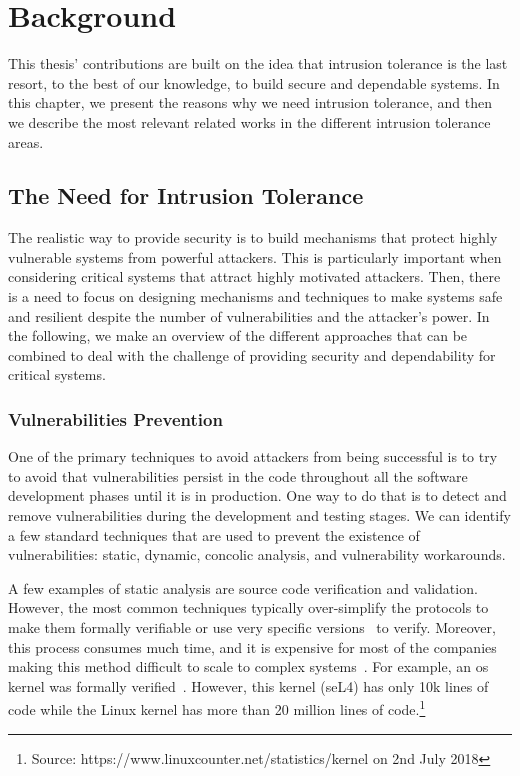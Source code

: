 \chapter{Background}
\label{chap:related_work}

This thesis' contributions are built on the idea that intrusion tolerance is the last resort, to the best of our knowledge, to build secure and dependable systems.
In this chapter, we present the reasons why we need intrusion tolerance, and then we describe the most relevant related works in the different intrusion tolerance areas.


\section{The Need for Intrusion Tolerance}
The realistic way to provide security is to build mechanisms that protect highly vulnerable systems from powerful attackers.
This is particularly important when considering critical systems that attract highly motivated attackers. 
Then, there is a need to focus on designing mechanisms and techniques to make systems safe and resilient despite the number of vulnerabilities and the attacker's power.
In the following, we make an overview of the different approaches that can be combined to deal with the challenge of providing security and dependability for critical systems.

\subsection{Vulnerabilities Prevention}
One of the primary techniques to avoid attackers from being successful is to try to avoid that vulnerabilities persist in the code throughout all the software development phases until it is in production. 
One way to do that is to detect and remove vulnerabilities during the development and testing stages.
We can identify a few standard techniques that are used to prevent the existence of vulnerabilities: static, dynamic, concolic analysis, and vulnerability workarounds.

A few examples of static analysis are source code verification and validation. 
However, the most common techniques typically over-simplify the protocols to make them formally verifiable or use very specific versions~\cite{Klein:2009,Nelson:2017} to verify. 
Moreover, this process consumes much time, and it is expensive for most of the companies making this method difficult to scale to complex systems~\cite{Giuffrida:2013}.
For example, an \gls{os} kernel was formally verified~\cite{Klein:2009}.
However, this kernel (seL4) has only 10k lines of code while the Linux kernel has more than 20 million lines of code.\footnote{Source: https://www.linuxcounter.net/statistics/kernel on 2nd July 2018}


